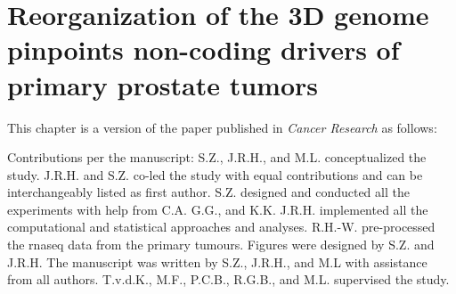 \chapter{Reorganization of the 3D genome pinpoints non-coding drivers of primary prostate tumors}
\label{chap:3D}

This chapter is a version of the paper published in \emph{Cancer Research} as follows:


\vspace{1em}

Contributions per the manuscript:
S.Z., J.R.H., and M.L. conceptualized the study.
J.R.H. and S.Z. co-led the study with equal contributions and can be interchangeably listed as first author.
S.Z. designed and conducted all the experiments with help from C.A. G.G., and K.K.
J.R.H. implemented all the computational and statistical approaches and analyses.
R.H.-W. pre-processed the \gls{rnaseq} data from the primary tumours.
Figures were designed by S.Z. and J.R.H.
The manuscript was written by S.Z., J.R.H., and M.L with assistance from all authors.
T.v.d.K., M.F., P.C.B., R.G.B., and M.L. supervised the study.






